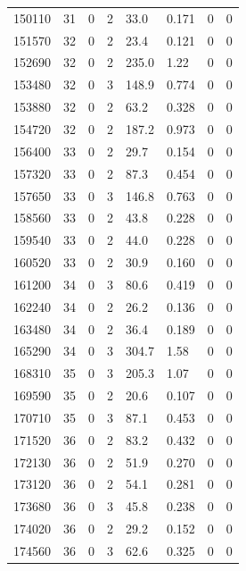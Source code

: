 \documentclass[preview]{standalone}
\begin{document}
{{{{{{{{{{{{\begin{tabular}{L{1.2cm}C{1.2cm} C{0.3cm}C{0.5cm} C{1.4cm}C{1.4cm} C{1.4cm}C{1.4cm}}
  150110  &    31  & 0     &  2 &  33.0  & 0.171  & 0 &  0   \\ 
  151570  &    32  & 0     &  2 &  23.4  & 0.121  & 0 &  0   \\ 
  152690  &    32  & 0     &  2 &  235.0  & 1.22  & 0 &  0   \\ 
  153480  &    32  & 0     &  3 &  148.9  & 0.774  & 0 &  0   \\ 
  153880  &    32  & 0     &  2 &  63.2  & 0.328  & 0 &  0   \\ 
  154720  &    32  & 0     &  2 &  187.2  & 0.973  & 0 &  0   \\ 
  156400  &    33  & 0     &  2 &  29.7  & 0.154  & 0 &  0   \\ 
  157320  &    33  & 0     &  2 &  87.3  & 0.454  & 0 &  0   \\ 
  157650  &    33  & 0     &  3 &  146.8  & 0.763  & 0 &  0   \\ 
  158560  &    33  & 0     &  2 &  43.8  & 0.228  & 0 &  0   \\ 
  159540  &    33  & 0     &  2 &  44.0  & 0.228  & 0 &  0   \\ 
  160520  &    33  & 0     &  2 &  30.9  & 0.160  & 0 &  0   \\ 
  161200  &    34  & 0     &  3 &  80.6  & 0.419  & 0 &  0   \\ 
  162240  &    34  & 0     &  2 &  26.2  & 0.136  & 0 &  0   \\ 
  163480  &    34  & 0     &  2 &  36.4  & 0.189  & 0 &  0   \\ 
  165290  &    34  & 0     &  3 &  304.7  & 1.58  & 0 &  0   \\ 
  168310  &    35  & 0     &  3 &  205.3  & 1.07  & 0 &  0   \\ 
  169590  &    35  & 0     &  2 &  20.6  & 0.107  & 0 &  0   \\ 
  170710  &    35  & 0     &  3 &  87.1  & 0.453  & 0 &  0   \\ 
  171520  &    36  & 0     &  2 &  83.2  & 0.432  & 0 &  0   \\ 
  172130  &    36  & 0     &  2 &  51.9  & 0.270  & 0 &  0   \\ 
  173120  &    36  & 0     &  2 &  54.1  & 0.281  & 0 &  0   \\ 
  173680  &    36  & 0     &  3 &  45.8  & 0.238  & 0 &  0   \\ 
  174020  &    36  & 0     &  2 &  29.2  & 0.152  & 0 &  0   \\ 
  174560  &    36  & 0     &  3 &  62.6  & 0.325  & 0 &  0   \\ 
\hline 
\end{tabular} 

}}}}}}}}}}}}
\end{document}
